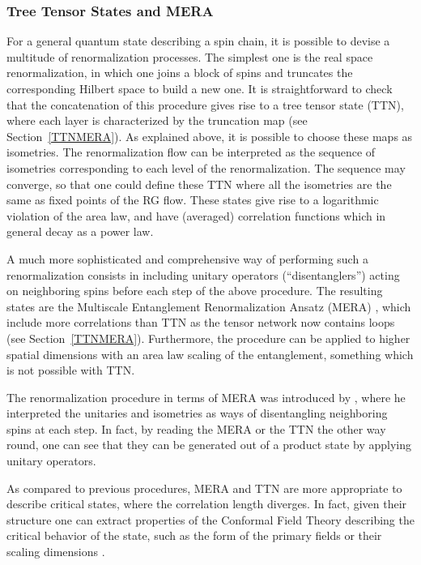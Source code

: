 \documentclass[rmp,aps,reprint,superscriptaddress,nobalancelastpage]{revtex4-1}
\begin{document}
\subsubsection{Tree Tensor States and MERA}
For a general quantum state describing a spin chain, it is possible to devise a multitude of renormalization processes. The simplest one is the real space renormalization, in which one joins a block of spins and truncates the corresponding Hilbert space to build a new one. It is straightforward to check that the concatenation of this procedure gives rise to a tree tensor state (TTN),  where each layer is characterized by the truncation map (see Section~\ref{TTNMERA}). As explained above, it is possible to choose these maps as isometries. The renormalization flow can be interpreted as the sequence of isometries corresponding to each level of the renormalization. The sequence may converge, so that one could define
these TTN where all the isometries are the same
as fixed points of the RG flow.
These states give rise to a logarithmic violation of the area law, and have (averaged) correlation functions which in general decay as a power law.

A much more sophisticated  and comprehensive way of performing such a renormalization consists in including unitary operators (``disentanglers'') acting on neighboring spins before each step of the above procedure. The resulting states are the Multiscale Entanglement Renormalization Ansatz (MERA) \cite{vidal:mera}, which include more correlations than TTN as the tensor network now contains loops (see Section~\ref{TTNMERA}). Furthermore, the procedure can be applied to higher spatial dimensions with an area law scaling of the entanglement, something which is not possible with TTN.

The renormalization procedure in terms of MERA was introduced by \citet{vidal:mera}, where he interpreted the unitaries and isometries as ways of disentangling neighboring spins at each step. In fact, by reading the MERA or the TTN the other way round, one can see that they can be generated out of a product state by applying unitary operators.

As compared to previous procedures, MERA and TTN are more appropriate to describe critical states, where the correlation length diverges. In fact, given their structure one can extract properties of the Conformal Field Theory describing the critical behavior of the state, such as the form of the primary fields or their scaling dimensions \cite{pfeifer:conformal-MERA,giovannetti:conformal-MERA,milsted2017extraction,zou2018conformal}.
\end{document}

